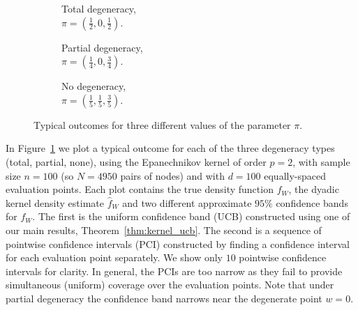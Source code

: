 \documentclass[11pt,lof]{puthesis}
\theoremstyle{break}
\theoremstyle{proof}
\begin{document}
\begin{figure}[b!]
  \centering
  \begin{subfigure}{0.32\textwidth}
    \centering
    \caption{Total degeneracy, \\
    $\pi = \left( \frac{1}{2}, 0, \frac{1}{2} \right)$.}
  \end{subfigure}
  \begin{subfigure}{0.32\textwidth}
    \centering
    \caption{Partial degeneracy, \\
    $\pi = \left( \frac{1}{4}, 0, \frac{3}{4} \right)$.}
  \end{subfigure}
  \begin{subfigure}{0.32\textwidth}
    \centering
    \caption{No degeneracy, \\
    $\pi = \left( \frac{1}{5}, \frac{1}{5}, \frac{3}{5} \right)$.}
  \end{subfigure}
  \caption[Typical outcomes for different values of the parameter $\pi$]
  {Typical outcomes for three different values of the parameter $\pi$.}
  \label{fig:kernel_results}
\end{figure}

In Figure~\ref{fig:kernel_results} we plot a typical outcome for each of the
three
degeneracy types (total, partial, none), using the Epanechnikov kernel of order
$p=2$, with sample size $n=100$ (so $N=4950$ pairs of nodes) and with $d=100$
equally-spaced evaluation points. Each plot contains the true density function
$f_W$, the dyadic kernel density estimate $\hat f_W$ and two different
approximate $95\%$ confidence bands for $f_W$. The first is the uniform
confidence band (UCB) constructed using one of our main results,
Theorem~\ref{thm:kernel_ucb}. The second is a sequence of pointwise confidence
intervals (PCI) constructed by finding a confidence interval for each
evaluation point separately. We show only $10$ pointwise confidence intervals
for clarity. In general, the PCIs are too narrow as they fail to provide
simultaneous (uniform) coverage over the evaluation points. Note that under
partial degeneracy the confidence band narrows near the degenerate point
$w = 0$.
\end{document}
